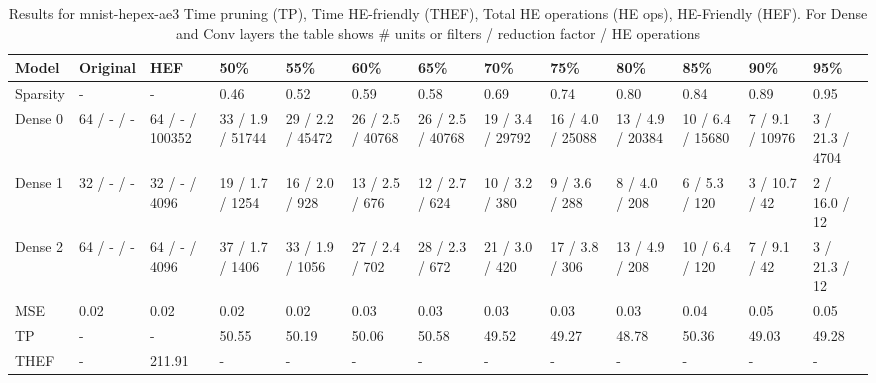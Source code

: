 \begin{table}
\centering
\caption{Results for mnist-hepex-ae3  Time pruning (TP), Time HE-friendly (THEF), Total HE operations (HE ops), HE-Friendly (HEF). For Dense and Conv layers the table shows # units or filters / reduction factor / HE operations}
\label{tab:mnist-hepex-ae3_results}
\begin{tabular}{lllllllllllll}
\toprule
Model &    Original &              HEF &               50\% &               55\% &               60\% &               65\% &               70\% &               75\% &               80\% &               85\% &              90\% &              95\% \\
\midrule
Sparsity  &           - &                - &              0.46 &              0.52 &              0.59 &              0.58 &              0.69 &              0.74 &              0.80 &              0.84 &             0.89 &             0.95 \\
Dense 0   &  64 / - / - &  64 / - / 100352 &  33 / 1.9 / 51744 &  29 / 2.2 / 45472 &  26 / 2.5 / 40768 &  26 / 2.5 / 40768 &  19 / 3.4 / 29792 &  16 / 4.0 / 25088 &  13 / 4.9 / 20384 &  10 / 6.4 / 15680 &  7 / 9.1 / 10976 &  3 / 21.3 / 4704 \\
Dense 1   &  32 / - / - &    32 / - / 4096 &   19 / 1.7 / 1254 &    16 / 2.0 / 928 &    13 / 2.5 / 676 &    12 / 2.7 / 624 &    10 / 3.2 / 380 &     9 / 3.6 / 288 &     8 / 4.0 / 208 &     6 / 5.3 / 120 &    3 / 10.7 / 42 &    2 / 16.0 / 12 \\
Dense 2   &  64 / - / - &    64 / - / 4096 &   37 / 1.7 / 1406 &   33 / 1.9 / 1056 &    27 / 2.4 / 702 &    28 / 2.3 / 672 &    21 / 3.0 / 420 &    17 / 3.8 / 306 &    13 / 4.9 / 208 &    10 / 6.4 / 120 &     7 / 9.1 / 42 &    3 / 21.3 / 12 \\
MSE       &        0.02 &             0.02 &              0.02 &              0.02 &              0.03 &              0.03 &              0.03 &              0.03 &              0.03 &              0.04 &             0.05 &             0.05 \\
TP        &           - &                - &             50.55 &             50.19 &             50.06 &             50.58 &             49.52 &             49.27 &             48.78 &             50.36 &            49.03 &            49.28 \\
THEF      &           - &           211.91 &                 - &                 - &                 - &                 - &                 - &                 - &                 - &                 - &                - &                - \\

\end{tabular}
\end{table}
